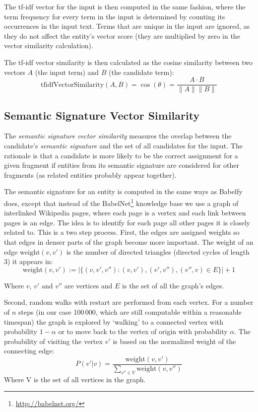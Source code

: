 \documentclass[runningheads,a4paper]{llncs}
\begin{document}
{The tf-idf vector for the input is then computed in the same fashion, where the term frequency for every term in the input is determined by counting its occurrences in the input text. Terms that are unique in the input are ignored, as they do not affect the entity's vector score (they are multiplied by zero in the vector similarity calculation).

The tf-idf vector similarity is then calculated as the cosine similarity between two vectors $A$ (the input term) and $B$ (the candidate term):
$$\mathrm{tfidfVectorSimilarity}(A, B) = \cos(\theta) = \frac{A \cdot B}{\|A\| \|B\|}$$

\subsection{Semantic Signature Vector Similarity}

The \emph{semantic signature vector similarity} measures the overlap between the candidate's \emph{semantic signature} and the set of all candidates for the input. The rationale is that a candidate is more likely to be the correct assignment for a given fragment if entities from its semantic signature are considered for other fragments (as related entities probably appear together).

The semantic signature for an entity is computed in the same ways as Babelfy \cite{Babelfy} does, except that instead of the BabelNet\footnote{\url{http://babelnet.org/}} knowledge base we use a graph of interlinked Wikipedia pages, where each page is a vertex and each link between pages is an edge. The idea is to identify for each page all other pages it is closely related to. This is a two step process. First, the edges are assigned weights so that edges in denser parts of the graph become more important. The weight of an edge $\mathrm{weight}(v, v')$ is the number of directed triangles (directed cycles of length 3) it appears in:
$$\mathrm{weight}(v, v') := |\{(v, v', v'') : (v, v'), (v', v''), (v'', v) \in E\}| + 1$$

Where $v$, $v'$ and $v''$ are vertices and $E$ is the set of all the graph's edges.

Second, random walks with restart are performed from each vertex. %
For a number of $n$ steps (in our case 100\,000, which are still computable within a reasonable timespan) the graph is explored by `walking' to a connected vertex with probability $1 - \alpha$ or to move back to the vertex of origin with probability $\alpha$. The probability of visiting the vertex $v'$ is based on the normalized weight of the connecting edge:
$$P(v'|v) = \frac{\mathrm{weight}(v, v')}{\sum\limits_{v''\in V} \mathrm{weight}(v, v'')}$$
Where V is the set of all vertices in the graph.

}
\end{document}
